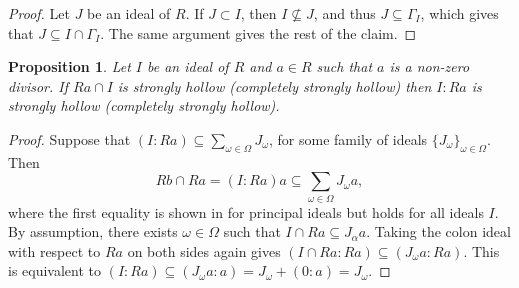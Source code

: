\documentclass[11pt,english]{amsart}
\newtheorem{proposition}[theorem]{Proposition}
\theoremstyle{definition}
\numberwithin{equation}{section}
\theoremstyle{remark}
\begin{document}
\begin{proof}
    Let $J$ be an ideal of $R$. If $J\subset I$, then $I\not\subseteq J$, and thus $J\subseteq \Gamma_I$, which gives that $J\subseteq I\cap\Gamma_I$. The same argument gives the rest of the claim. 
\end{proof}

\begin{proposition}\label{colon_ideal}
    Let $I$ be an ideal of $R$ and $a\in R$ such that $a$ is a non-zero divisor. If $Ra\cap I$ is strongly hollow (completely strongly hollow) then $I:Ra$ is strongly hollow (completely strongly hollow).
\end{proposition}
\begin{proof}
    Suppose that $(I:Ra)\subseteq \sum_{\omega\in\Omega}J_\omega$, for some family of ideals $\{J_\omega \}_{\omega\in\Omega}$. Then \[Rb\cap Ra=(I:Ra)a\subseteq \sum_{\omega\in\Omega}J_\omega a,\] where the first equality is shown in \cite[Lemma.~2.5]{HRR2002} for principal ideals but holds for all ideals $I$. By assumption, there exists $\omega\in\Omega$ such that $I\cap Ra\subseteq J_\alpha a$. Taking the colon ideal with respect to $Ra$ on both sides again gives $(I\cap Ra:Ra)\subseteq (J_\omega a:Ra)$. This is equivalent to $(I:Ra)\subseteq (J_\omega a:a)=J_\omega +(0:a)=J_\omega$.
\end{proof}
\end{document}

